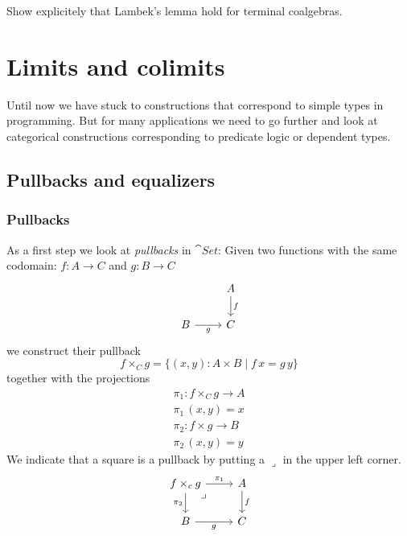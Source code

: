 \begin{Exercise}
  Show explicitely that Lambek's lemma hold for terminal coalgebras.
\end{Exercise}

\newpage
\section{Limits and colimits}
\label{sec:limits-colimits}

Until now we have stuck to constructions that correspond to simple types in programming. But for many applications we need to go further and look at categorical constructions corresponding to predicate logic or dependent types.

\subsection{Pullbacks and equalizers}
\label{sec:pullbacks-equalizers}

\subsubsection*{Pullbacks}
\label{sec:pullbacks}

As a first step we look at \emph{pullbacks} in $\cat{Set}$: Given two functions with the same codomain: $f : A \to C$ and $g : B \to C$ 
\[\begin{tikzcd}
& A \arrow[d,"f"] \\
B \arrow[r,"g" below] &C 
\end{tikzcd}\]
we construct their pullback 
\[ f \times_C g = \{ (x,y) : A \times B \mid f\,x = g\,y \} \]
together with the projections
\begin{align*}
\pi_1 : f \times_C g \to A \\
\pi_1\,(x,y) = x \\
\pi_2 : f \times g \to B \\
\pi_2\,(x,y) = y 
\end{align*}
We indicate that a square is a pullback by putting a $\lrcorner$ in the upper left corner.
\[\begin{tikzcd}
f \times_c g \arrow[r,"\pi_1"] \arrow[d,"\pi_2" left] \arrow[dr, phantom, "\lrcorner", very near start]
    & A \arrow[d,"f"] \\
B \arrow[r,"g" below] &C 
\end{tikzcd}\]

